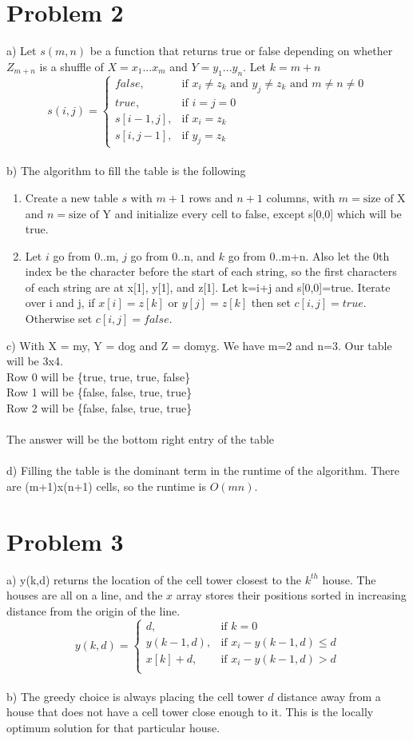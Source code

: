 \documentclass{article}
\begin{document}
\section*{Problem 2}
a) Let $s(m,n)$ be a function that returns true or false depending on whether $Z_{m+n}$ is a shuffle of $X = x_1 ... x_m$ and $Y = y_1 ... y_n$.  Let $k=m+n$
\[
    s(i,j)= 
\begin{cases}
    false,& \text{if } x_i\neq z_k \text{ and } y_j\neq z_k \text{ and } m\neq n\neq 0\\
    true,& \text{if } i=j=0\\
    s[i-1, j],& \text{if } x_i=z_k\\
    s[i, j-1],& \text{if } y_j=z_k
\end{cases}
\]\\
b) The algorithm to fill the table is the following
\begin{enumerate}
  \item Create a new table $s$ with $m+1$ rows and $n+1$ columns, with $m=\text{size of X}$ and $n=\text{size of Y}$ and initialize every cell to false, except s[0,0] which will be true.
  \item Let $i$ go from 0..m, $j$ go from 0..n, and $k$ go from 0..m+n. Also let the 0th index be the character before the start of each string, so the first characters of each string are at x[1], y[1], and z[1]. Let k=i+j and s[0,0]=true. Iterate over i and j, if $x[i]=z[k]$ or $y[j]=z[k]$ then set $c[i,j]=true$. Otherwise set $c[i,j]=false$.
\end{enumerate}
c) With X = my, Y = dog and Z = domyg. We have m=2 and n=3.  Our table will be 3x4.\\
Row 0 will be \{true, true, true, false\}\\
Row 1 will be \{false, false, true, true\}\\
Row 2 will be \{false, false, true, true\}\\\\
The answer will be the bottom right entry of the table\\\\
d) Filling the table is the dominant term in the runtime of the algorithm.  There are (m+1)x(n+1) cells, so the runtime is $O(mn)$.\\
\section*{Problem 3}
a) y(k,d) returns the location of the cell tower closest to the $k^{th}$ house.  The houses are all on a line, and the $x$ array stores their positions sorted in increasing distance from the origin of the line.
\[
    y(k,d)= 
\begin{cases}
    d,& \text{if } k=0\\
    y(k-1,d),& \text{if } x_i-y(k-1,d)\leq d\\
    x[k]+d,& \text{if } x_i-y(k-1,d)> d\\
\end{cases}
\]\\
b) The greedy choice is always placing the cell tower $d$ distance away from a house that does not have a cell tower close enough to it.  This is the locally optimum solution for that particular house.
\end{document}
